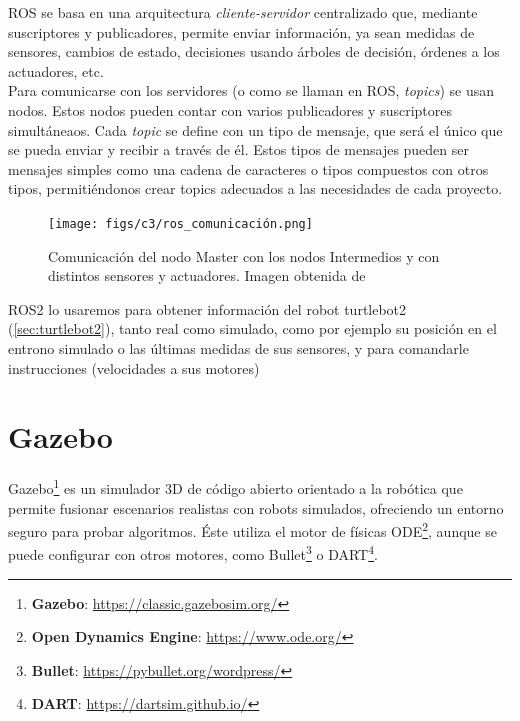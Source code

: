 ROS se basa en una arquitectura \textit{cliente-servidor} centralizado que, mediante suscriptores y publicadores, permite enviar información, ya sean medidas de sensores, cambios de estado, decisiones usando árboles de decisión, órdenes a los actuadores, etc.\\

Para comunicarse con los servidores (o como se llaman en ROS, \textit{topics}) se usan nodos. Estos nodos pueden contar con varios publicadores y suscriptores simultáneaos.
Cada \textit{topic} se define con un tipo de mensaje, que será el único que se pueda enviar y recibir a través de él. Estos tipos de mensajes pueden ser mensajes simples como una cadena de caracteres o tipos compuestos con otros tipos, permitiéndonos crear topics adecuados a las necesidades de cada proyecto.\\

\begin{figure} [H]
    \begin{center}
        \texttt{[image: figs/c3/ros\_comunicación.png]}
    \end{center}
    \caption[Comunicación entre nodos ROS.]{Comunicación del nodo Master con los nodos Intermedios y con distintos sensores y actuadores. Imagen obtenida de \cite{comunicacion_ros2}}
    \label{fig:ros_master_comunicacion}
\end{figure}

ROS2 lo usaremos para obtener información del robot turtlebot2 (\ref{sec:turtlebot2}), tanto real como simulado, como por ejemplo su posición en el entrono simulado o las últimas medidas de sus sensores, y para comandarle instrucciones (velocidades a sus motores)

\section{Gazebo}
\label{sec:gazebo}

Gazebo\footnote{\textbf{Gazebo}: \url{https://classic.gazebosim.org/}} es un simulador 3D de código abierto orientado a la robótica que permite fusionar escenarios realistas con robots simulados, ofreciendo un entorno seguro para probar algoritmos. Éste utiliza el motor de físicas ODE\footnote{\textbf{Open Dynamics Engine}: \url{https://www.ode.org/}}, aunque se puede configurar con otros motores, como Bullet\footnote{\textbf{Bullet}: \url{https://pybullet.org/wordpress/}} o DART\footnote{\textbf{DART}: \url{https://dartsim.github.io/}}.\\

